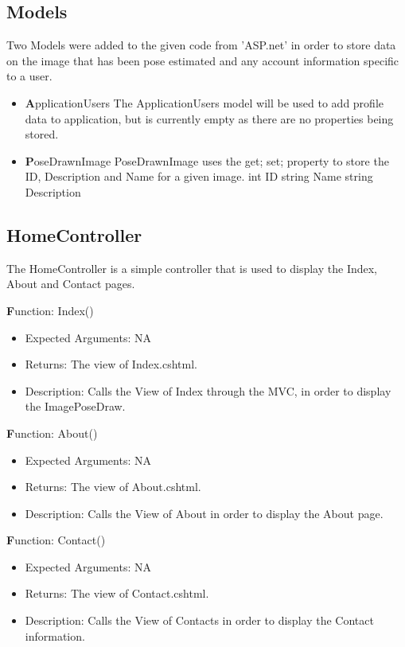 \documentclass{scrreprt}
\begin{document}
\subsection{Models}
Two Models were added to the given code from 'ASP.net' in order to store data on the image that has been pose estimated and any account information specific to a user.

    \begin{itemize}
      \item \textbf  ApplicationUsers
      The ApplicationUsers model will be used to add profile data to application, but is currently empty as there are no properties being stored.

      \item \textbf  PoseDrawnImage
      PoseDrawnImage uses the {get; set;} property to store the ID, Description and Name for a given image.
        int ID
        string Name
        string Description
      
    \end{itemize}

\subsection{HomeController}
The HomeController is a simple controller that is used to display the Index, About and Contact pages. 

  \textbf Function: Index()
  \begin{itemize}
    \item Expected Arguments:
    NA
    \item Returns:
    The view of Index.cshtml.
    \item Description:
    Calls the View of Index through the MVC, in order to display the ImagePoseDraw.
  \end{itemize}

  \textbf Function: About()
  \begin{itemize}
    \item Expected Arguments:
    NA
    \item Returns:
    The view of About.cshtml.
    \item Description:
    Calls the View of About in order to display the About page.
  \end{itemize}

  \textbf Function: Contact()
  \begin{itemize}
    \item Expected Arguments:
    NA
    \item Returns:
    The view of Contact.cshtml.
    \item Description:
    Calls the View of Contacts in order to display the Contact information.
  \end{itemize}
\end{document}
